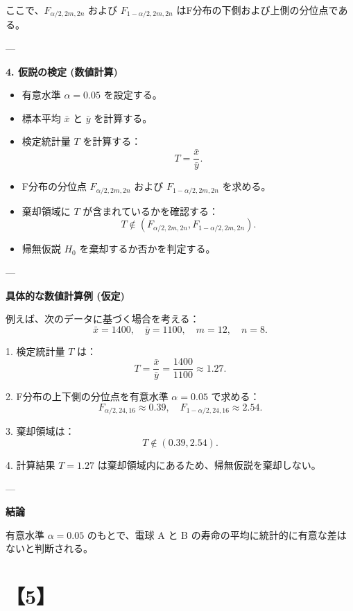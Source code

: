 \documentclass[10pt]{jsarticle}
\begin{document}
ここで、\(F_{\alpha/2, 2m, 2n}\) および \(F_{1-\alpha/2, 2m, 2n}\) はF分布の下側および上側の分位点である。

---

{\bf 4. 仮説の検定 (数値計算)}

\begin{itemize}
    \item 有意水準 \(\alpha = 0.05\) を設定する。
    \item 標本平均 \(\bar{x}\) と \(\bar{y}\) を計算する。
    \item 検定統計量 \(T\) を計算する：
    \[
    T = \frac{\bar{x}}{\bar{y}}.
    \]
    \item F分布の分位点 \(F_{\alpha/2, 2m, 2n}\) および \(F_{1-\alpha/2, 2m, 2n}\) を求める。
    \item 棄却領域に \(T\) が含まれているかを確認する：
    \[
    T \notin \left( F_{\alpha/2, 2m, 2n}, F_{1-\alpha/2, 2m, 2n} \right).
    \]
    \item 帰無仮説 \(H_0\) を棄却するか否かを判定する。
\end{itemize}

---

{\bf 具体的な数値計算例 (仮定)}

例えば、次のデータに基づく場合を考える：
\[
\bar{x} = 1400, \quad \bar{y} = 1100, \quad m = 12, \quad n = 8.
\]

1. 検定統計量 \(T\) は：
\[
T = \frac{\bar{x}}{\bar{y}} = \frac{1400}{1100} \approx 1.27.
\]

2. F分布の上下側の分位点を有意水準 \(\alpha = 0.05\) で求める：
\[
F_{\alpha/2, 24, 16} \approx 0.39, \quad F_{1-\alpha/2, 24, 16} \approx 2.54.
\]

3. 棄却領域は：
\[
T \notin (0.39, 2.54).
\]

4. 計算結果 \(T = 1.27\) は棄却領域内にあるため、帰無仮説を棄却しない。

---

{\bf 結論}

有意水準 \(\alpha = 0.05\) のもとで、電球 A と B の寿命の平均に統計的に有意な差はないと判断される。


\bigskip
\bigskip

\section*{【5】}

\end{document}
